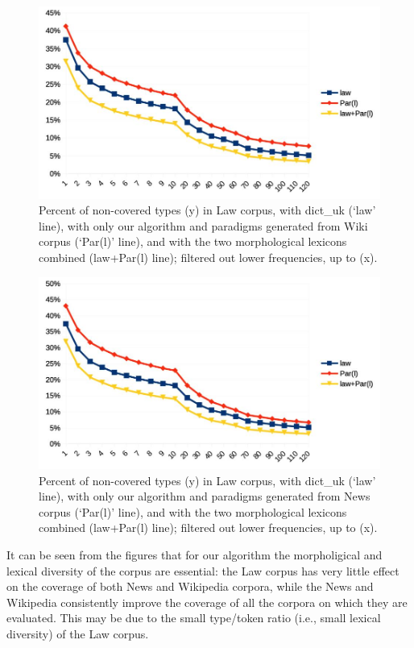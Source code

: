 \documentclass[11pt,a4paper]{article}
\begin{document}
\begin{figure}
	\includegraphics[width=\linewidth]{evaluation-coverage-lawW.jpg}
	\caption{Percent of non-covered types (y) in Law corpus, with dict\_uk (`law' line), with only our algorithm and paradigms generated from Wiki corpus (`Par(l)' line), and with the two morphological lexicons combined (law+Par(l) line); filtered out lower frequencies, up to (x).}
	\label{fig:pcNoTypLawW}
\end{figure}

\begin{figure}
	\includegraphics[width=\linewidth]{evaluation-coverage-lawN.jpg}
	\caption{Percent of non-covered types (y) in Law corpus, with dict\_uk (`law' line), with only our algorithm and paradigms generated from News corpus (`Par(l)' line), and with the two morphological lexicons combined (law+Par(l) line); filtered out lower frequencies, up to (x).}
	\label{fig:pcNoTypLawN}
\end{figure}


It can be seen from the figures that for our algorithm the morpholigical and lexical diversity of the corpus are essential: the Law corpus has very little effect on the coverage of both News and Wikipedia corpora, while the News and Wikipedia consistently improve the coverage of all the corpora on which they are evaluated. This may be due to the small type/token ratio (i.e., small lexical diversity) of the Law corpus.
\end{document}
